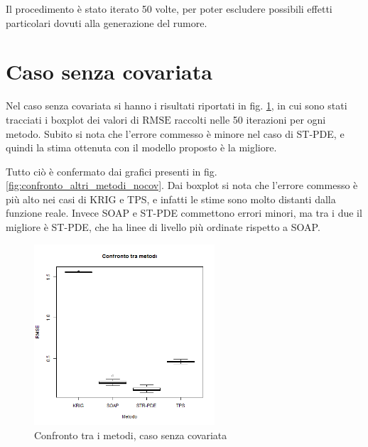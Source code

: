 \documentclass[a4paper,11pt,twoside,openright]{book}							%
\begin{document}
Il procedimento è stato iterato 50 volte, per poter escludere possibili effetti particolari dovuti alla generazione del rumore.

\newpage
\section{Caso senza covariata}
Nel caso senza covariata si hanno i risultati riportati in fig. \ref{fig:cfr}, in cui sono stati tracciati i boxplot dei valori di $\mathrm{RMSE}$ raccolti nelle 50 iterazioni per ogni metodo. Subito si nota che l'errore commesso è minore nel caso di ST-PDE, e quindi la stima ottenuta con il modello proposto è la migliore.

Tutto ciò è confermato dai grafici presenti in fig. \ref{fig:confronto_altri_metodi_nocov}. Dai boxplot si nota che l'errore commesso è più alto nei casi di KRIG e TPS, e infatti le stime sono molto distanti dalla funzione reale. Invece SOAP e ST-PDE commettono errori minori, ma tra i due il migliore è ST-PDE, che ha linee di livello più ordinate rispetto a SOAP. 

\begin{figure}[t]
	\centering
	\includegraphics[width=0.60\textwidth]{Immagini/Confronto_metodi.png}   
	\caption{Confronto tra i metodi, caso senza covariata}
	\label{fig:cfr}
\end{figure}
\end{document}
